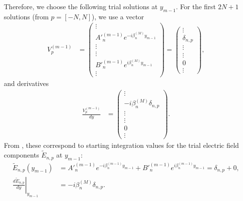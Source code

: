 Therefore, we choose the following trial solutions at $y_{m-1}$.  For the first $2N+1$ solutions (from $p=[-N,N]$), we use a vector 
\begin{align}
V^{(m-1)}_{p} &=   \left(\begin{array}{c}\vdots \\   A'^{(m-1)}_n  e^{-i \beta^{(M)}_n y_{m-1}}  \\ \vdots \\\hline \vdots \\  B'^{(m-1)}_n  e^{i \beta^{(M)}_n y_{m-1}}  \\ \vdots \end{array}\right)  =  \left(\begin{array}{c} \vdots \\  \delta_{n,p}  \\ \vdots \\\hline \vdots \\ 0 \\ \vdots \end{array}\right),
\end{align}
and derivatives
\begin{align}
\frac{V^{(m-1)}_{p}}{dy} &=  \left(\begin{array}{c} \vdots \\  -i \beta^{(M)}_n \delta_{n,p}   \\ \vdots  \\\hline \vdots \\ 0 \\ \vdots \end{array}\right).
\end{align}
From , these correspond to starting integration values for the trial electric field components $\tilde E_{n,p}$ at $y_{m-1}$:
\begin{align}
\tilde E_{n,p} (y_{m-1}) &= A'^{(m-1)}_n e^{-i \beta^{(m-1)}_n y_{m-1}} + B'^{(m-1)}_n e^{i \beta^{(m-1)}_n y_{m-1}} = \delta_{n,p} + 0 ,\\
\left. \frac{d \tilde E_{n,p}}{dy} \right|_{y_{m-1}} &= -i \beta^{(M)}_n \delta_{n,p}.
\end{align}


